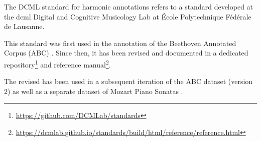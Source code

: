 

The DCML standard for harmonic annotations refers to a
standard developed at the \gls{dcml} Digital and Cognitive Musicology
Lab at \'Ecole Polytechnique F\'ed\'erale de Lausanne.

This standard was first used in the annotation of the
Beethoven Annotated Corpus (ABC)
\parencite{neuwirth2018annotated}. Since then, it has been
revised and documented in a dedicated
repository\footnote{\href{https://github.com/DCMLab/standards}{https://github.com/DCMLab/standards}}
and reference
manual\footnote{\href{https://dcmlab.github.io/standards/build/html/reference/reference.html}{https://dcmlab.github.io/standards/build/html/reference/reference.html}}.

The revised has been used in a subsequent iteration of the
ABC dataset (version 2) as well as a separate dataset of
Mozart Piano Sonatas \parencite{hentschel2021annotated}.
